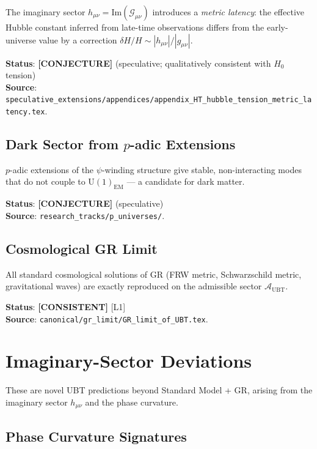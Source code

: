 \documentclass[11pt,a4paper]{article}
\theoremstyle{definition}
\theoremstyle{remark}
\begin{document}
The imaginary sector $h_{\mu\nu} = \mathrm{Im}(\mathcal{G}_{\mu\nu})$ introduces
a \emph{metric latency}: the effective Hubble constant inferred from late-time
observations differs from the early-universe value by a correction
$\delta H / H \sim |h_{\mu\nu}|/|g_{\mu\nu}|$.

\noindent\textbf{Status}: \textbf{[CONJECTURE]} (speculative; qualitatively consistent with $H_0$ tension) \\
\noindent\textbf{Source}: \texttt{speculative\_extensions/appendices/appendix\_HT\_hubble\_tension\_metric\_latency.tex}.

\subsection{Dark Sector from $p$-adic Extensions}

$p$-adic extensions of the $\psi$-winding structure give stable, non-interacting
modes that do not couple to $\mathrm{U}(1)_{\mathrm{EM}}$ — a candidate for
dark matter.

\noindent\textbf{Status}: \textbf{[CONJECTURE]} (speculative) \\
\noindent\textbf{Source}: \texttt{research\_tracks/p\_universes/}.

\subsection{Cosmological GR Limit}

All standard cosmological solutions of GR (FRW metric, Schwarzschild metric,
gravitational waves) are exactly reproduced on the admissible sector
$\mathcal{A}_{\mathrm{UBT}}$.

\noindent\textbf{Status}: \textbf{[CONSISTENT]} [L1] \\
\noindent\textbf{Source}: \texttt{canonical/gr\_limit/GR\_limit\_of\_UBT.tex}.

\section{Imaginary-Sector Deviations}\label{sec:imaginary}

These are novel UBT predictions beyond Standard Model + GR, arising from the
imaginary sector $h_{\mu\nu}$ and the phase curvature.

\subsection{Phase Curvature Signatures}
\end{document}
